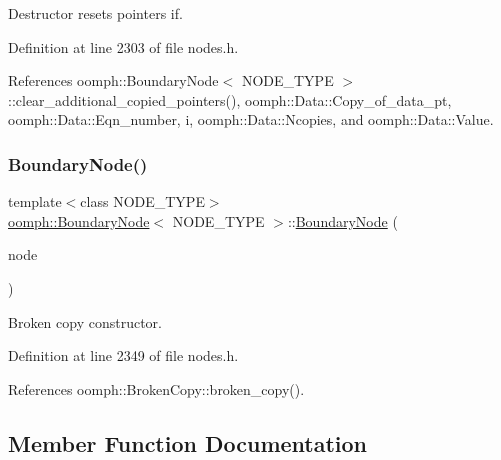 Destructor resets pointers if. 



Definition at line 2303 of file nodes.\+h.



References oomph\+::\+Boundary\+Node$<$ N\+O\+D\+E\+\_\+\+T\+Y\+P\+E $>$\+::clear\+\_\+additional\+\_\+copied\+\_\+pointers(), oomph\+::\+Data\+::\+Copy\+\_\+of\+\_\+data\+\_\+pt, oomph\+::\+Data\+::\+Eqn\+\_\+number, i, oomph\+::\+Data\+::\+Ncopies, and oomph\+::\+Data\+::\+Value.

\mbox{\label{classoomph_1_1BoundaryNode_a8502b4932002ab66f83090086d3f558a}} 
\subsubsection{\texorpdfstring{Boundary\+Node()}{BoundaryNode()}\hspace{0.1cm}{\footnotesize\ttfamily [6/6]}}
{\footnotesize\ttfamily template$<$class N\+O\+D\+E\+\_\+\+T\+Y\+PE$>$ \\
\hyperlink{classoomph_1_1BoundaryNode}{oomph\+::\+Boundary\+Node}$<$ N\+O\+D\+E\+\_\+\+T\+Y\+PE $>$\+::\hyperlink{classoomph_1_1BoundaryNode}{Boundary\+Node} (\begin{DoxyParamCaption}\item[{const \hyperlink{classoomph_1_1BoundaryNode}{Boundary\+Node}$<$ N\+O\+D\+E\+\_\+\+T\+Y\+PE $>$ \&}]{node }\end{DoxyParamCaption})\hspace{0.3cm}{\ttfamily [inline]}}



Broken copy constructor. 



Definition at line 2349 of file nodes.\+h.



References oomph\+::\+Broken\+Copy\+::broken\+\_\+copy().



\subsection{Member Function Documentation}
\mbox{\label{classoomph_1_1BoundaryNode_aa2fa81a38645fe14ccea5b10c2985f38}} 
